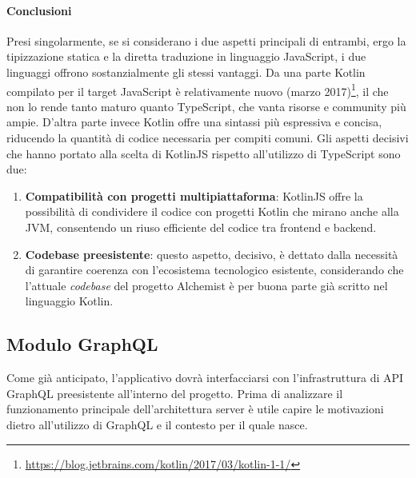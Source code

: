 \paragraph{Conclusioni}
Presi singolarmente, se si considerano i due aspetti principali di entrambi, ergo la tipizzazione statica e la diretta traduzione in linguaggio JavaScript, i due linguaggi offrono sostanzialmente gli stessi vantaggi. Da una parte Kotlin compilato per il target JavaScript è relativamente nuovo (marzo 2017)\footnote{\url{https://blog.jetbrains.com/kotlin/2017/03/kotlin-1-1/}}, il che non lo rende tanto maturo quanto TypeScript, che vanta risorse e community più ampie. D'altra parte invece Kotlin offre una sintassi più espressiva e concisa, riducendo la quantità di codice necessaria per compiti comuni. Gli aspetti decisivi che hanno portato alla scelta di KotlinJS rispetto all'utilizzo di TypeScript sono due:
\begin{enumerate}
	\item \textbf{Compatibilità con progetti multipiattaforma}: KotlinJS offre la possibilità di condividere il codice con progetti Kotlin che mirano anche alla JVM, consentendo un riuso efficiente del codice tra frontend e backend.
	\item \textbf{Codebase preesistente}: questo aspetto, decisivo,  è dettato dalla necessità di garantire coerenza con l'ecosistema tecnologico esistente, considerando che l'attuale \textit{codebase} del progetto Alchemist è per buona parte già scritto nel linguaggio Kotlin.
\end{enumerate}

\subsection{Modulo GraphQL}
Come già anticipato, l'applicativo dovrà interfacciarsi con l'infrastruttura di API GraphQL preesistente all'interno del progetto. 
Prima di analizzare il funzionamento principale dell'architettura server è utile capire le motivazioni dietro all'utilizzo di GraphQL e il contesto per il quale nasce.

